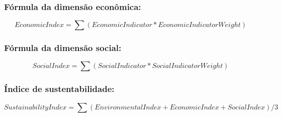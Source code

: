 \subsubsection*{Fórmula da dimensão econômica:}

\[
EconomicIndex=\sum(EconomicIndicator*EconomicIndicatorWeight)
\]


\subsubsection*{Fórmula da dimensão social:}

\[
SocialIndex=\sum(SocialIndicator*SocialIndicatorWeight)
\]


\subsubsection*{Índice de sustentabilidade:}

\[
SustainabilityIndex=\sum(EnvironmentalIndex+EconomicIndex+SocialIndex)/3
\]


